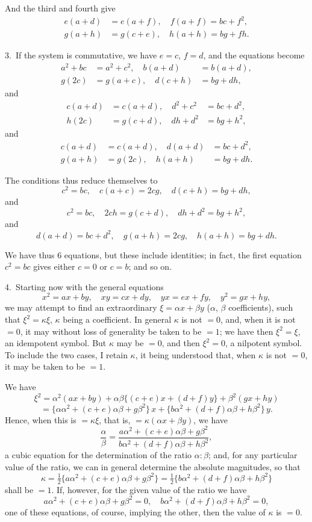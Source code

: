 \documentclass[11pt,a4paper]{book}
\begin{document}
And the third and fourth give
\begin{align*}
e(a + d) &= e(a + f),\quad f(a + f) = bc + f^2,\\
g(a + h) &= g(c + e),\quad h(a + h) = bg + fh.
\end{align*}

3.~If the system is commutative, we have $e = c$, $f = d$, and the equations become
\begin{align*}
a^2 + bc &= a^2 + c^2,\quad b(a + d) &= b(a + d),\\
g(2c) &= g(a + c),\quad d(c + h) &= bg + dh,
\end{align*}
and
\begin{align*}
c(a + d) &= c(a + d),\quad d^2 + c^2 &= bc + d^2,\\
h(2c) &= g(c + d),\quad dh + d^2 &= bg + h^2,
\end{align*}
and
\begin{align*}
c(a + d) &= c(a + d),\quad d(a + d) &= bc + d^2,\\
g(a + h) &= g(2c),\quad h(a + h) &= bg + dh.
\end{align*}

The conditions thus reduce themselves to
\[
c^2 = bc,\quad c(a + c) = 2cg,\quad d(c + h) = bg + dh,
\]
and
\[
c^2 = bc,\quad 2ch = g(c + d),\quad dh + d^2 = bg + h^2,
\]
and
\[
d(a + d) = bc + d^2,\quad g(a + h) = 2cg,\quad h(a + h) = bg + dh.
\]

We have thus 6 equations, but these include identities; in fact, the first equation $c^2 = bc$ gives either $c = 0$ or $c = b$; and so on.

4.~Starting now with the general equations
\[
x^2 = ax + by,\quad xy = cx + dy,\quad yx = ex + fy,\quad y^2 = gx + hy,
\]
we may attempt to find an extraordinary $\xi = \alpha x + \beta y$ ($\alpha$, $\beta$ coefficients), such that $\xi^2 = \kappa\xi$, $\kappa$ being a coefficient. In general $\kappa$ is not $=0$, and, when it is not $=0$, it may without loss of generality be taken to be $=1$; we have then $\xi^2 = \xi$, an idempotent symbol. But $\kappa$ may be $=0$, and then $\xi^2 = 0$, a nilpotent symbol. To include the two cases, I retain $\kappa$, it being understood that, when $\kappa$ is not $=0$, it may be taken to be $=1$.

We have
\[
\xi^2 = \alpha^2(ax+by) + \alpha\beta\{(c+e)x + (d+f)y\} + \beta^2(gx+hy)
\]
\[
= \{\alpha\alpha^2 + (c+e)\alpha\beta + g\beta^2\}\,x + \{b\alpha^2 + (d+f)\alpha\beta + h\beta^2\}\,y.
\]
Hence, when this is $=\kappa\xi$, that is, $=\kappa(\alpha x + \beta y)$, we have
\[
\frac{\alpha}{\beta} = \frac{a\alpha^2 + (c+e)\alpha\beta + g\beta^2}{b\alpha^2 + (d+f)\alpha\beta + h\beta^2},
\]
a cubic equation for the determination of the ratio $\alpha:\beta$; and, for any particular value of the ratio, we can in general determine the absolute magnitudes, so that
\[
\kappa = \tfrac{1}{2}\{a\alpha^2 + (c+e)\alpha\beta + g\beta^2\} = \tfrac{1}{2}\{b\alpha^2 + (d+f)\alpha\beta + h\beta^2\}
\]
shall be $=1$. If, however, for the given value of the ratio we have
\[
a\alpha^2 + (c+e)\alpha\beta + g\beta^2 = 0,\quad b\alpha^2 + (d+f)\alpha\beta + h\beta^2 = 0,
\]
one of these equations, of course, implying the other, then the value of $\kappa$ is $=0$.
\end{document}
